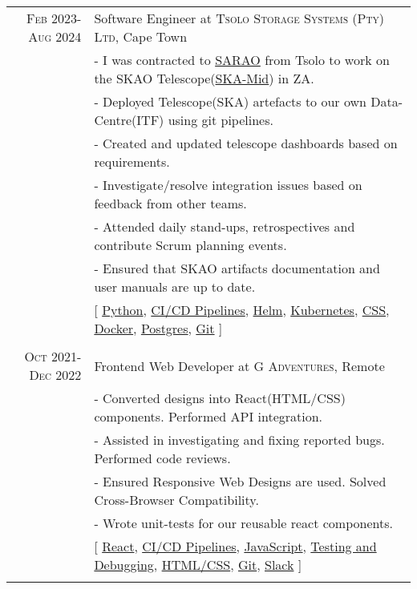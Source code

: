\documentclass[a4paper,10pt]{article} %
\begin{document}
\begin{tabular}{r|p{15cm}}
\textsc{Feb 2023-Aug 2024} & Software Engineer at \textsc{Tsolo Storage Systems (Pty) Ltd}, Cape Town \emph{}\\
& \footnotesize{- I was contracted to \href{https://www.skao.int/en/explore/telescopes/ska-mid}{SARAO} from Tsolo to work on the SKAO Telescope(\href{https://www.skao.int/en/explore/telescopes/ska-mid}{SKA-Mid}) in ZA.}\\
& \footnotesize{- Deployed Telescope(SKA) artefacts to our own Data-Centre(ITF) using git pipelines.}\\
& \footnotesize{- Created and updated telescope dashboards based on requirements.}\\
& \footnotesize{- Investigate/resolve integration issues based on feedback from other teams.}\\
& \footnotesize{- Attended daily stand-ups, retrospectives and contribute Scrum planning events.}\\
& \footnotesize{- Ensured that SKAO artifacts documentation and user manuals are up to date.}\\
& \footnotesize{[ \href{https://www.python.org/}{Python}, \href{https://github.com/solutions/ci-cd}{CI/CD Pipelines}, \href{https://helm.sh/}{Helm}, \href{https://kubernetes.io/}{Kubernetes}, \href{https://datatracker.ietf.org/doc/html/rfc7993}{CSS}, \href{https://www.docker.com/}{Docker}, \href{https://www.postgresql.org/}{Postgres}, \href{https://git-scm.com/}{Git}   ]}\\
\multicolumn{2}{c}{} \\


\textsc{Oct 2021-Dec 2022} & Frontend Web Developer at \textsc{G Adventures}, Remote \emph{}\\
& \footnotesize{- Converted designs into React(HTML/CSS) components. Performed API integration.}\\
& \footnotesize{- Assisted in investigating and fixing reported bugs. Performed code reviews.}\\
& \footnotesize{- Ensured Responsive Web Designs are used. Solved Cross-Browser Compatibility.}\\
& \footnotesize{- Wrote unit-tests for our reusable react components.}\\
& \footnotesize{[ \href{https://react.dev/}{React}, \href{https://github.com/solutions/ci-cd}{CI/CD Pipelines}, \href{https://developer.mozilla.org/en-US/docs/Web/JavaScript}{JavaScript}, \href{https://jestjs.io/}{Testing and Debugging}, \href{https://datatracker.ietf.org/doc/html/rfc7993}{HTML/CSS}, \href{https://git-scm.com/}{Git}, \href{https://slack.com/}{Slack} ]}\\
\multicolumn{2}{c}{} \\


\end{tabular}
\end{document}
